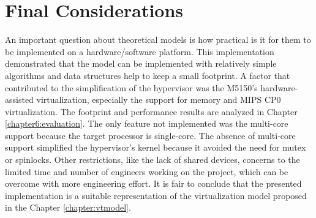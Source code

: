 
\section{Final Considerations}

An important question about theoretical models is how practical is it for them to be implemented on a hardware/software platform. This implementation demonstrated that the model can be implemented with relatively simple algorithms and data structures help to keep a small footprint. A factor that contributed to the simplification of the hypervisor was the M5150's hardware-assisted virtualization, especially the support for memory and MIPS CP0 virtualization. The footprint and performance results are analyzed in Chapter \ref{chapter6:evaluation}. The only feature not implemented was the multi-core support because the target processor is single-core. The absence of multi-core support simplified the hypervisor's kernel because it avoided the need for mutex or spinlocks. Other restrictions, like the lack of shared devices, concerns to the limited time and number of engineers working on the project, which can be overcome with more engineering effort. It is fair to conclude that the presented implementation is a suitable representation of the virtualization model proposed in the Chapter \ref{chapter:vtmodel}.



































